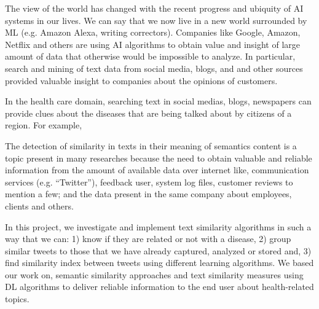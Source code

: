 \documentclass[12pt]{report}
\begin{document}
	The view of the world has changed with the recent progress and ubiquity   of \ac{AI} systems in our lives. We can say that we now live in a new world surrounded by \ac{ML} (e.g. Amazon Alexa, writing correctors). Companies like Google, Amazon, Netflix and others are using \ac{AI} algorithms to obtain value and insight of large amount of data that  otherwise would be  impossible to analyze. In particular, search and mining of text data from social media, blogs, and and other sources provided valuable insight to companies about the opinions of customers. 

In the health care domain, searching text in social medias, blogs, newspapers can provide clues about the diseases that are being talked about 
by citizens of a region. For example, 
	
	The detection of similarity in texts in their meaning of semantics content is a topic present in many researches because the need to obtain valuable and reliable information from the amount of available data over internet like, communication services (e.g. “Twitter”), feedback user, system log files, customer reviews to mention a few; and the data present in the same company about employees, clients and others. 
	
	In this project, we investigate and implement text similarity algorithms in such a way that we can: 1) know if they are related or not with a disease, 2) group similar tweets to those that we have already captured, analyzed or stored and, 3) find similarity index between tweets using different learning algorithms. We based our work on, semantic similarity approaches and text similarity measures using \ac{DL} algorithms to deliver reliable information to the end user about health-related topics.
	
	
\end{document}
